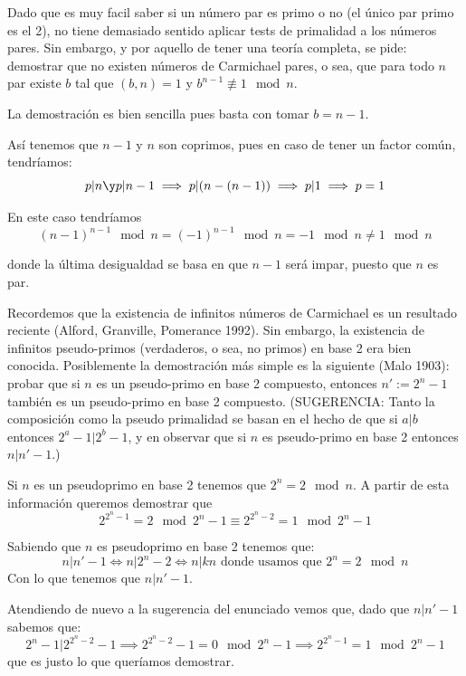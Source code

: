\begin{problem}[13]
Dado que es muy facil saber si un número par es primo o no (el
único par primo es el 2), no tiene demasiado sentido aplicar tests
de primalidad a los números pares. Sin embargo, y por aquello de
tener una teoría completa, se pide: demostrar que no existen
números de Carmichael pares, o sea, que para todo $n$ par existe
$b$ tal que $(b,n)=1$ y $b^{n-1}\not\equiv 1\mod n$.

\solution


La demostración es bien sencilla pues basta con tomar $b=n-1$.

Así tenemos que $n-1$ y $n$ son coprimos, pues en caso de tener un factor común, tendríamos:
\[p|n \y p|n-1 \implies p|(n-(n-1)) \implies p| 1 \implies p=1\]

En este caso tendríamos
\[(n-1)^{n-1} \mod n = (-1)^{n-1} \mod n = -1 \mod n \neq 1 \mod n\]

donde la última desigualdad se basa en que $n-1$ será impar, puesto que $n$ es par.

\end{problem}

\begin{problem}[14]
Recordemos que la existencia de infinitos números de Carmichael es
un resultado reciente (Alford, Granville, Pomerance 1992). Sin
embargo, la existencia de infinitos pseudo-primos (verdaderos, o
sea, no primos) en base 2 era bien conocida. Posiblemente la
demostración más simple es la siguiente (Malo 1903): probar que si
$n$ es un pseudo-primo en base 2 compuesto, entonces $n':=2^n-1$
también es un pseudo-primo en base 2 compuesto. (SUGERENCIA: Tanto
la composición como la pseudo primalidad se basan en el hecho de
que si $a\vert b$ entonces $2^a-1\vert 2^b-1$, y en observar que
si $n$ es pseudo-primo en base 2 entonces $n\vert n'-1$.)
\solution


Si $n$ es un pseudoprimo en base 2 tenemos que $2^n=2 \mod n$. A partir de esta información queremos demostrar que
\[2^{2^n-1}=2 \mod 2^n-1 \equiv 2^{2^n-2} = 1 \mod 2^n-1\]

Sabiendo que $n$ es pseudoprimo en base 2 tenemos que:
\[n|n'-1 \iff n| 2^n-2 \iff n|kn \text{ donde usamos que } 2^n=2 \mod n\]
Con lo que tenemos que $n|n'-1$.

Atendiendo de nuevo a la sugerencia del enunciado vemos que, dado que $n|n'-1$ sabemos que:
\[2^n-1 | 2^{2^n-2}-1 \implies 2^{2^n-2}-1 = 0 \mod 2^n-1 \implies 2^{2^n-1} = 1 \mod 2^n-1\]
que es justo lo que queríamos demostrar.

\end{problem}

